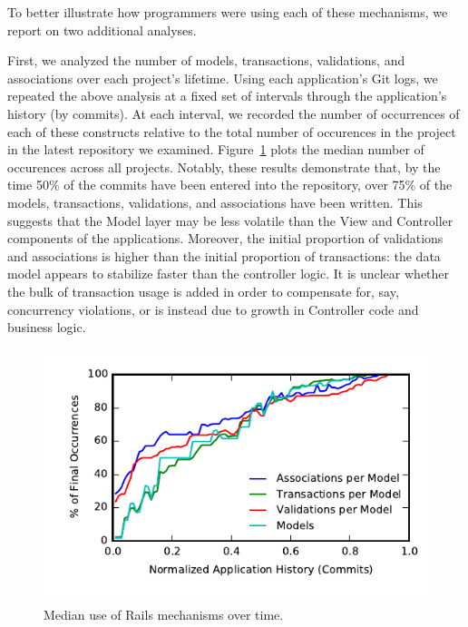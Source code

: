  To better illustrate how programmers
were using each of these mechanisms, we report on two additional
analyses.

First, we analyzed the number of models, transactions, validations,
and associations over each project's lifetime. Using each
application's Git logs, we repeated the above analysis at a fixed set
of intervals through the application's history (by commits). At each
interval, we recorded the number of occurrences of each of these
constructs relative to the total number of occurences in the project
in the latest repository we examined. Figure~\ref{fig:historical}
plots the median number of occurences across all projects. Notably,
these results demonstrate that, by the time 50\% of the commits have
been entered into the repository, over 75\% of the models,
transactions, validations, and associations have been written. This
suggests that the Model layer may be less volatile than the View and
Controller components of the applications. Moreover, the initial
proportion of validations and associations is higher than the initial
proportion of transactions: the data model appears to stabilize faster
than the controller logic. It is unclear whether the bulk of
transaction usage is added in order to compensate for, say,
concurrency violations, or is instead due to growth in Controller code
and business logic.

\begin{figure}
\includegraphics[width=\columnwidth]{figs/historical-median.pdf}\vspace{-2em}
\caption{Median use of Rails mechanisms over time.}
\label{fig:historical}
\end{figure}

